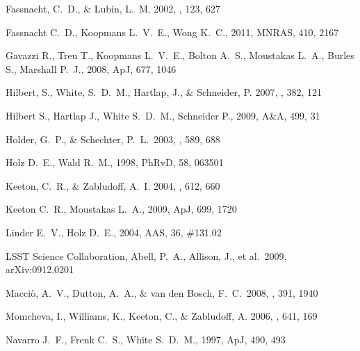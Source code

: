 \begin{thebibliography}{99}
{Fassnacht}, C.~D., \& {Lubin}, L.~M. 2002, \aj, 123, 627

 Fassnacht C.~D., Koopmans L.~V.~E., Wong K.~C., 2011, MNRAS, 410, 2167 


 Gavazzi R., Treu T., Koopmans L.~V.~E., 
Bolton A.~S., Moustakas L.~A., Burles S., Marshall P.~J., 2008, ApJ, 677, 
1046 

{Hilbert}, S., {White}, S.~D.~M., {Hartlap}, J., \& {Schneider}, P. 2007,
  \mnras, 382, 121

 Hilbert S., Hartlap J., White S.~D.~M., Schneider P., 2009, A\&A, 499, 31 


 Holder, G.~P., \& Schechter, P.~L.\ 2003, \apj, 589, 688 


 Holz D.~E., Wald R.~M., 1998, PhRvD, 58, 063501 


{Keeton}, C.~R., \& {Zabludoff}, A.~I. 2004, \apj, 612, 660

 Keeton C.~R., Moustakas L.~A., 2009, ApJ, 699, 1720 


 Linder E.~V., Holz D.~E., 2004, AAS, 36, \#131.02 

 LSST 
Science Collaboration, Abell, P.~A., Allison, J., et al.\ 2009, 
arXiv:0912.0201 

 Macci{\`o}, A.~V., 
Dutton, A.~A., \& van den Bosch, F.~C.\ 2008, \mnras, 391, 1940 



{Momcheva}, I., {Williams}, K., {Keeton}, C., \& {Zabludoff}, A. 2006, \apj,
  641, 169


 Navarro J.~F., Frenk C.~S., White S.~D.~M., 1997, ApJ, 490, 493 



\end{thebibliography}
